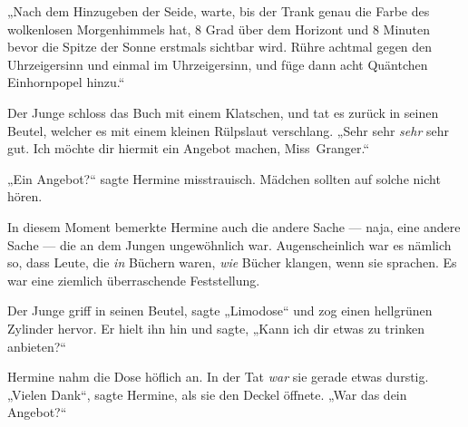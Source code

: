 „Nach dem Hinzugeben der Seide, warte, bis der Trank genau die Farbe des wolkenlosen Morgenhimmels hat, 8 Grad über dem Horizont und 8 Minuten bevor die Spitze der Sonne erstmals sichtbar wird. Rühre achtmal gegen den Uhrzeigersinn und einmal im Uhrzeigersinn, und füge dann acht Quäntchen Einhornpopel hinzu.“

Der Junge schloss das Buch mit einem Klatschen, und tat es zurück in seinen Beutel, welcher es mit einem kleinen Rülpslaut verschlang.
„Sehr sehr \emph{sehr} sehr gut. Ich möchte dir hiermit ein Angebot machen, Miss~Granger.“

„Ein Angebot?“ sagte Hermine misstrauisch. Mädchen sollten auf solche nicht hören.

In diesem Moment bemerkte Hermine auch die andere Sache — naja, eine andere Sache — die an dem Jungen ungewöhnlich war. Augenscheinlich war es nämlich so, dass Leute, die \emph{in} Büchern waren, \emph{wie} Bücher klangen, wenn sie sprachen. Es war eine ziemlich überraschende Feststellung.

Der Junge griff in seinen Beutel, sagte
„Limodose“ und zog einen hellgrünen Zylinder hervor. Er hielt ihn hin und sagte,
„Kann ich dir etwas zu trinken anbieten?“

Hermine nahm die Dose höflich an. In der Tat \emph{war} sie gerade etwas durstig.
„Vielen Dank“, sagte Hermine, als sie den Deckel öffnete.
„War das dein Angebot?“

